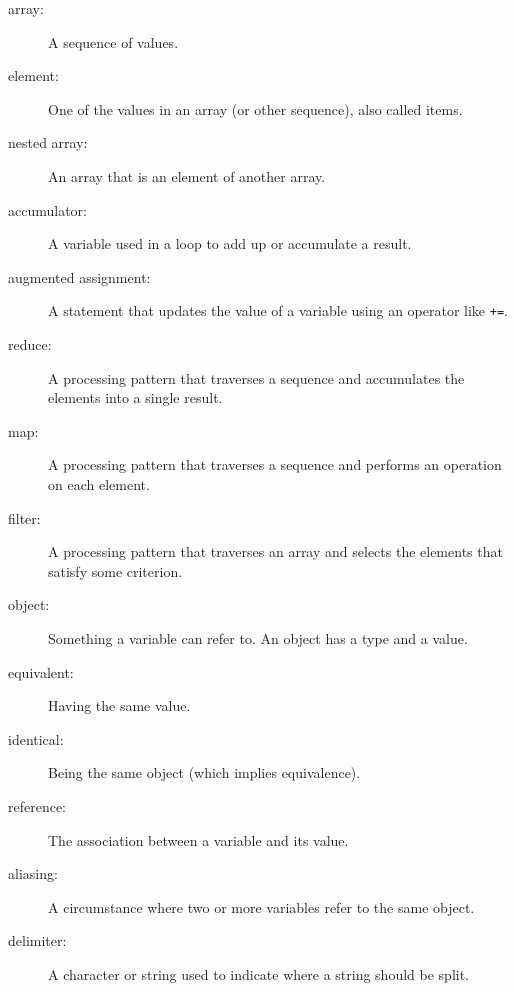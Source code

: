 \documentclass[10pt]{book}
\begin{document}
\begin{description}

\item[array:] A sequence of values.

\item[element:] One of the values in an array (or other sequence),
also called items.

\item[nested array:] An array that is an element of another array.

\item[accumulator:] A variable used in a loop to add up or
accumulate a result.

\item[augmented assignment:] A statement that updates the value
of a variable using an operator like \verb"+=".

\item[reduce:] A processing pattern that traverses a sequence 
and accumulates the elements into a single result.

\item[map:] A processing pattern that traverses a sequence and
performs an operation on each element.

\item[filter:] A processing pattern that traverses an array and
selects the elements that satisfy some criterion.

\item[object:] Something a variable can refer to.  An object
has a type and a value.

\item[equivalent:] Having the same value.

\item[identical:] Being the same object (which implies equivalence).

\item[reference:] The association between a variable and its value.

\item[aliasing:] A circumstance where two or more variables refer to the same
object.

\item[delimiter:] A character or string used to indicate where a
string should be split.

\end{description}
\end{document}

